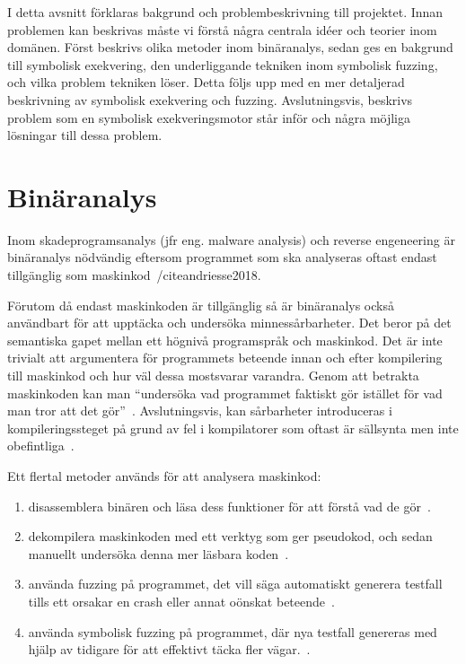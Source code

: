 I detta avsnitt förklaras bakgrund och problembeskrivning till projektet. Innan
problemen kan beskrivas måste vi förstå några centrala idéer och teorier inom
domänen. Först beskrivs olika metoder inom binäranalys, sedan ges en bakgrund
till symbolisk exekvering, den underliggande tekniken inom symbolisk fuzzing, och vilka
problem tekniken löser. Detta följs upp med en mer detaljerad beskrivning av symbolisk
exekvering och fuzzing. Avslutningsvis, beskrivs problem som en symbolisk exekveringsmotor
står inför och några möjliga lösningar till dessa problem.

\section{Binäranalys}
\label{sec:binar_analys}
Inom skadeprogramsanalys (jfr eng. malware analysis) och reverse engeneering
är binäranalys nödvändig eftersom programmet som ska analyseras oftast endast
tillgänglig som maskinkod~/cite{andriesse2018}.

Förutom då endast maskinkoden är tillgänglig så är binäranalys också användbart för att
upptäcka och undersöka minnessårbarheter. Det beror på det semantiska gapet mellan ett
högnivå programspråk och maskinkod. Det är inte trivialt att argumentera för programmets
beteende innan och efter kompilering
till maskinkod och hur väl dessa mostsvarar varandra. Genom att betrakta
maskinkoden kan man ``undersöka vad programmet faktiskt gör istället för vad
man tror att det gör''~\cite{andriesse2018}. Avslutningsvis, kan sårbarheter
introduceras i kompileringssteget på grund av fel i kompilatorer som oftast är
sällsynta men inte obefintliga~\cite{silentbugsmatter}.

Ett flertal metoder används för att analysera maskinkod:
\begin{enumerate}
    \item disassemblera binären och läsa dess funktioner för att förstå vad de gör~\cite{ghidra_website}.
    \item dekompilera maskinkoden med ett verktyg som ger pseudokod, och sedan manuellt undersöka denna mer läsbara koden~\cite{ghidra_website}.
    \item använda fuzzing på programmet, det vill säga automatiskt generera testfall tills ett orsakar en crash eller
          annat oönskat beteende~\cite{8371326}.
    \item använda symbolisk fuzzing på programmet, där nya testfall genereras med hjälp av tidigare för att effektivt täcka fler vägar.~\cite{sage}.
\end{enumerate}

